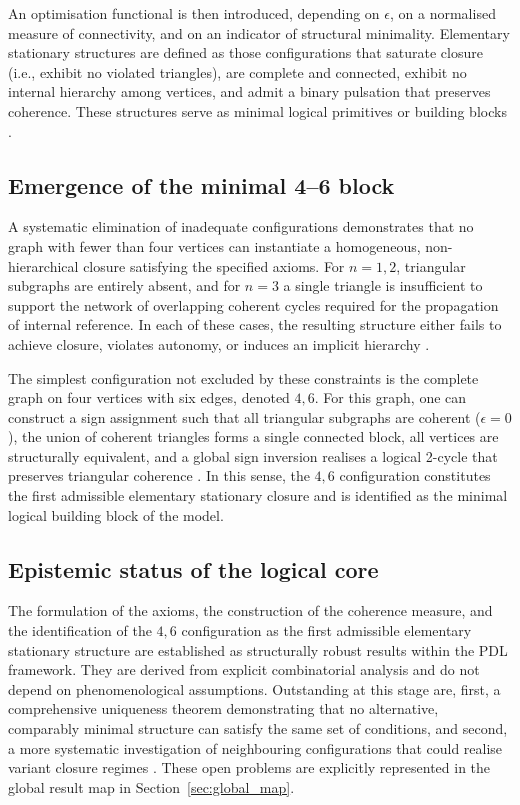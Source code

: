 \documentclass{article}
\begin{document}
An optimisation functional is then introduced, depending on \(\epsilon\), on a normalised measure of connectivity, and on an indicator of structural minimality. Elementary stationary structures are defined as those configurations that saturate closure (i.e., exhibit no violated triangles), are complete and connected, exhibit no internal hierarchy among vertices, and admit a binary pulsation that preserves coherence. These structures serve as minimal logical primitives or building blocks \cite{PDL_Main_2026,PDL_position}.

\subsection{Emergence of the minimal 4--6 block}
\label{subsec:4_6_block}

A systematic elimination of inadequate configurations demonstrates that no graph with fewer than four vertices can instantiate a homogeneous, non-hierarchical closure satisfying the specified axioms. For \(n = 1,2\), triangular subgraphs are entirely absent, and for \(n = 3\) a single triangle is insufficient to support the network of overlapping coherent cycles required for the propagation of internal reference. In each of these cases, the resulting structure either fails to achieve closure, violates autonomy, or induces an implicit hierarchy \cite{PDL_Main_2026}.

The simplest configuration not excluded by these constraints is the complete graph on four vertices with six edges, denoted \(4,6\). For this graph, one can construct a sign assignment such that all triangular subgraphs are coherent (\(\epsilon = 0\)), the union of coherent triangles forms a single connected block, all vertices are structurally equivalent, and a global sign inversion realises a logical 2-cycle that preserves triangular coherence
\cite{PDL_Main_2026,PDL_intro}. In this sense, the \(4,6\) configuration constitutes the first admissible elementary stationary closure and is identified as the minimal logical building block of the model.

\subsection{Epistemic status of the logical core}
\label{subsec:logical_status}

The formulation of the axioms, the construction of the coherence measure, and the identification of the \(4,6\) configuration as the first admissible elementary stationary structure are established as structurally robust results within the PDL framework. They are derived from explicit combinatorial analysis and do not depend on phenomenological assumptions. Outstanding at this stage are, first, a comprehensive uniqueness theorem demonstrating that no alternative, comparably minimal structure can satisfy the same set of conditions, and second, a more systematic investigation of neighbouring configurations that could realise variant closure regimes \cite{PDL_position}. These open problems are explicitly represented in the global result map in Section~\ref{sec:global_map}.
\end{document}
